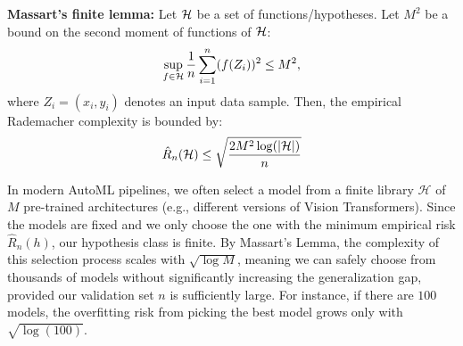 \begin{mdframed}[
    roundcorner=10pt,
    leftmargin=0.1\textwidth,
    rightmargin=0.1\textwidth]
    \textbf{Massart's finite lemma:} Let $\mathcal{H}$ be a set of functions/hypotheses.
    Let $M^2$ be a bound on the second moment of functions of $\mathcal{H}$:
    \[ \sup_{f \in \mathcal{H}} \frac 1 n \sum_{i = 1}^n (f(Z_i))^2 \le M^2, \]
    where $Z_i = (x_i, y_i)$ denotes an input data sample.
    Then, the empirical Rademacher complexity is bounded by:
    \begin{align}
        \hat{R}_n(\mathcal{H}) \le \sqrt{ \frac {2M^2 \log(\left\lvert\mathcal{H}\right\rvert)} n } \label{eq_emp_massart}
    \end{align}
\end{mdframed}

\begin{example}
    In modern AutoML pipelines, we often select a model from a finite library $\mathcal{H}$ of $M$ pre-trained architectures (e.g., different versions of Vision Transformers). Since the models are fixed and we only choose the one with the minimum empirical risk $\hat{R}_n(h)$, our hypothesis class is finite. By Massart's Lemma, the complexity of this selection process scales with $\sqrt{\log M}$, meaning we can safely choose from thousands of models without significantly increasing the generalization gap, provided our validation set $n$ is sufficiently large. For instance, if there are $100$ models, the overfitting risk from picking the best model grows only with $\sqrt{\log(100)}$.
\end{example}

